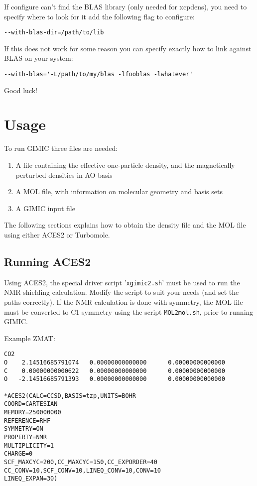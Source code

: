 \documentclass[a4paper,11pt]{article}
\begin{document}
If configure can't find the BLAS library (only needed for xcpdens), you need
to specify where to look for it add the following flag to configure: 
\begin{verbatim}
--with-blas-dir=/path/to/lib
\end{verbatim}

If this does not work for some reason you can specify exactly how to link
against BLAS on your system: 
\begin{verbatim}
--with-blas='-L/path/to/my/blas -lfooblas -lwhatever'
\end{verbatim}

Good luck!

\section{Usage}
To run GIMIC three files are needed:
\begin{enumerate}
  \item A file containing the effective one-particle density, and the
	magnetically perturbed densities in AO basis
  \item A MOL file, with information on molecular geometry and basis sets      
  \item A GIMIC input file
\end{enumerate}
The following sections explains how to obtain the density file and the MOL
file using either ACES2 or Turbomole.

\subsection{Running ACES2}
Using ACES2, the special driver script
'\texttt{xgimic2.sh}' must be used to run the NMR shielding calculation. Modify
the script to suit your needs (and set the paths correctly). If the NMR
calculation is done with symmetry, the MOL file must be converted to C1
symmetry using the script \texttt{MOL2mol.sh}, prior to running GIMIC.

Example ZMAT:
\begin{verbatim}
CO2
O    2.14516685791074   0.00000000000000      0.00000000000000
C    0.00000000000622   0.00000000000000      0.00000000000000
O   -2.14516685791393   0.00000000000000      0.00000000000000

*ACES2(CALC=CCSD,BASIS=tzp,UNITS=BOHR
COORD=CARTESIAN
MEMORY=250000000
REFERENCE=RHF
SYMMETRY=ON
PROPERTY=NMR
MULTIPLICITY=1
CHARGE=0
SCF_MAXCYC=200,CC_MAXCYC=150,CC_EXPORDER=40
CC_CONV=10,SCF_CONV=10,LINEQ_CONV=10,CONV=10
LINEQ_EXPAN=30)
\end{verbatim}
\end{document}
